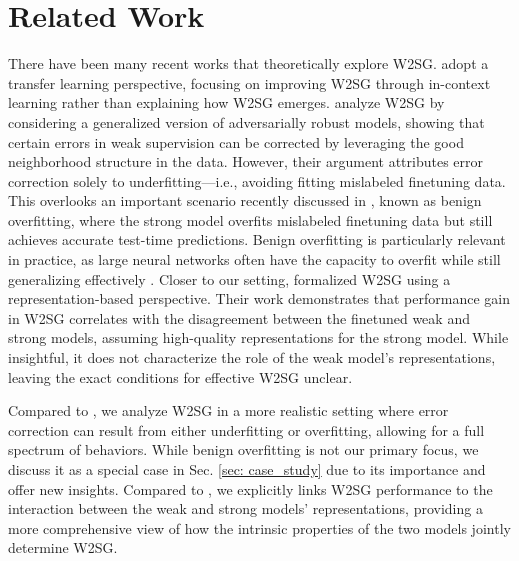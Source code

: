 \section{Related Work}

There have been many recent works that theoretically explore W2SG. \citet{somerstep2024statistical} adopt a transfer learning perspective, focusing on improving W2SG through in-context learning rather than explaining how W2SG emerges. \citet{lang2024theoretical,shin2024weak} analyze W2SG by considering a generalized version of adversarially robust models, showing that certain errors in weak supervision can be corrected by leveraging the good neighborhood structure in the data. However, their argument attributes error correction solely to underfitting—i.e., avoiding fitting mislabeled finetuning data.  This overlooks an important scenario recently discussed in \cite{wu2024provable}, known as benign overfitting, where the strong model overfits mislabeled finetuning data but still achieves accurate test-time predictions. Benign overfitting is particularly relevant in practice, as large neural networks often have the capacity to overfit while still generalizing effectively \cite{zhang2021understanding}. Closer to our setting, \citet{charikar2024quantifying} formalized W2SG using a representation-based perspective. %
Their work demonstrates that performance gain in W2SG correlates with the disagreement between the finetuned weak and strong models, assuming high-quality representations for the strong model. While insightful, it does not characterize the role of the weak model's representations, leaving the exact conditions for effective W2SG unclear.

Compared to \cite{lang2024theoretical}, we analyze W2SG in a more realistic setting where error correction can result from either underfitting or overfitting, allowing for a full spectrum of behaviors. While benign overfitting is not our primary focus, we discuss it as a special case in Sec. \ref{sec: case_study} due to its importance and offer new insights. Compared to \cite{charikar2024quantifying}, we explicitly links W2SG performance to the interaction between the weak and strong models' representations, providing a more comprehensive view of how the intrinsic properties of the two models jointly determine W2SG.


